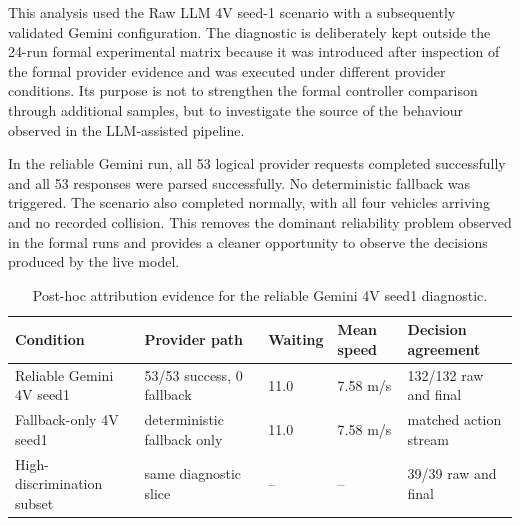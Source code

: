 \documentclass[letterpaper,10pt,conference]{ieeeconf}
\begin{document}
This analysis used the Raw LLM 4V seed-1 scenario with a subsequently validated Gemini configuration. The diagnostic is deliberately kept outside the 24-run formal experimental matrix because it was introduced after inspection of the formal provider evidence and was executed under different provider conditions. Its purpose is not to strengthen the formal controller comparison through additional samples, but to investigate the source of the behaviour observed in the LLM-assisted pipeline.



In the reliable Gemini run, all 53 logical provider requests completed successfully and all 53 responses were parsed successfully. No deterministic fallback was triggered. The scenario also completed normally, with all four vehicles arriving and no recorded collision. This removes the dominant reliability problem observed in the formal runs and provides a cleaner opportunity to observe the decisions produced by the live model.





\begin{table}[t]

\centering

\caption{Post-hoc attribution evidence for the reliable Gemini 4V seed1 diagnostic.}

\label{tab:posthoc_attribution}

\renewcommand{\arraystretch}{1.08}

\footnotesize

\begin{tabular}{p{1.9cm} p{1.55cm} p{1.1cm} p{1.2cm} p{1.9cm}}

\toprule

\textbf{Condition} & \textbf{Provider path} & \textbf{Waiting} & \textbf{Mean speed} & \textbf{Decision agreement} \\

\midrule

Reliable Gemini 4V seed1 & 53/53 success, 0 fallback & 11.0 & 7.58 m/s & 132/132 raw and final \\

Fallback-only 4V seed1 & deterministic fallback only & 11.0 & 7.58 m/s & matched action stream \\

High-discrimination subset & same diagnostic slice & -- & -- & 39/39 raw and final \\

\bottomrule

\end{tabular}

\end{table}
\end{document}
